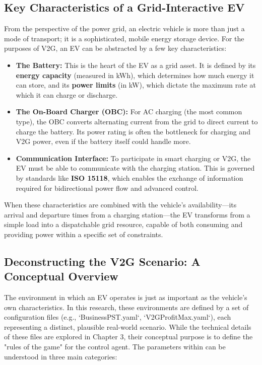 \subsection{Key Characteristics of a Grid-Interactive EV}
From the perspective of the power grid, an electric vehicle is more than just a mode of transport; it is a sophisticated, mobile energy storage device. For the purposes of V2G, an EV can be abstracted by a few key characteristics:
\begin{itemize}
    \item \textbf{The Battery:} This is the heart of the EV as a grid asset. It is defined by its \textbf{energy capacity} (measured in kWh), which determines how much energy it can store, and its \textbf{power limits} (in kW), which dictate the maximum rate at which it can charge or discharge.
    \item \textbf{The On-Board Charger (OBC):} For AC charging (the most common type), the OBC converts alternating current from the grid to direct current to charge the battery. Its power rating is often the bottleneck for charging and V2G power, even if the battery itself could handle more.
    \item \textbf{Communication Interface:} To participate in smart charging or V2G, the EV must be able to communicate with the charging station. This is governed by standards like \textbf{ISO 15118}, which enables the exchange of information required for bidirectional power flow and advanced control.
\end{itemize}
When these characteristics are combined with the vehicle's availability—its arrival and departure times from a charging station—the EV transforms from a simple load into a dispatchable grid resource, capable of both consuming and providing power within a specific set of constraints.

\subsection{Deconstructing the V2G Scenario: A Conceptual Overview}
The environment in which an EV operates is just as important as the vehicle's own characteristics. In this research, these environments are defined by a set of configuration files (e.g., `BusinessPST.yaml`, `V2GProfitMax.yaml`), each representing a distinct, plausible real-world scenario. While the technical details of these files are explored in Chapter 3, their conceptual purpose is to define the "rules of the game" for the control agent. The parameters within can be understood in three main categories:

